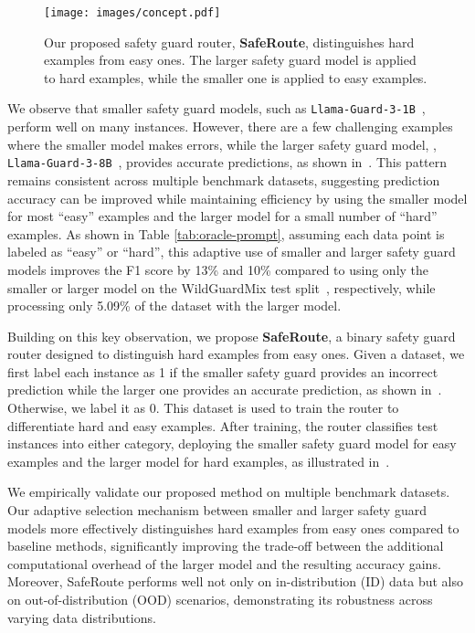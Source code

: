 \begin{figure*}[t]
\centering
    \texttt{[image: images/concept.pdf]}
    \vspace{-0.5em}
    \caption{Our proposed safety guard router, \textbf{SafeRoute}, distinguishes hard examples from easy ones. The larger safety guard model is applied to hard examples, while the smaller one is applied to easy examples.}
    \vspace{-0.1in}
    \label{fig:concept}
\end{figure*}


We observe that smaller safety guard models, such as \texttt{Llama-Guard-3-1B}~\citep{metallamaguard3}, perform well on many instances. However, there are a few challenging examples where the smaller model makes errors, while the larger safety guard model, \eg, \texttt{Llama-Guard-3-8B}~\citep{metallamaguard3}, provides accurate predictions, as shown in~. This pattern remains consistent across multiple benchmark datasets, suggesting prediction accuracy can be improved while maintaining efficiency by using the smaller model for most ``easy'' examples and the larger model for a small number of ``hard'' examples. 
As shown in Table \ref{tab:oracle-prompt}, assuming each data point is labeled as ``easy'' or ``hard'', this adaptive use of smaller and larger safety guard models improves the F1 score by 13\% and 10\% compared to using only the smaller or larger model on the WildGuardMix test split~\citep{wildguard}, respectively, while processing only 5.09\% of the dataset with the larger model.

Building on this key observation, we propose \textbf{SafeRoute}, a binary safety guard router designed to distinguish hard examples from easy ones. Given a dataset, we first label each instance as 1 if the smaller safety guard provides an incorrect prediction while the larger one provides an accurate prediction, as shown in~. Otherwise, we label it as 0.
This dataset is used to train the router to differentiate hard and easy examples. After training, the router classifies test instances into either category, deploying the smaller safety guard model for easy examples and the larger model for hard examples, as illustrated in~.


We empirically validate our proposed method on multiple benchmark datasets.
Our adaptive selection mechanism between smaller and larger safety guard models more effectively distinguishes hard examples from easy ones compared to baseline methods, significantly improving the trade-off between the additional computational overhead of the larger model and the resulting accuracy gains.
Moreover, SafeRoute performs well not only on in-distribution (ID) data but also on out-of-distribution (OOD) scenarios, demonstrating its robustness across varying data distributions.

